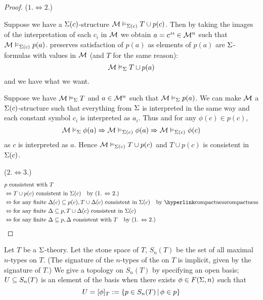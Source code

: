 \begin{proof}
    ($1. \iff 2.$) 
    \begin{forward}
        Suppose we have a $\Sigma(c)$-structure 
        $\mathcal{M} \vDash_{\Sigma(c)} T \cup p(c)$.
        Then by taking the images of the interpretation of each $c_i$ in $\mathcal{M}$
        we obtain $a = \modintp{\MM}{c} \in {\MM}^n$ such that 
        $\mathcal{M} \vDash_{\Sigma(c)} p(a)$.
         preserves 
        satisfaction of $p(a)$  as elements of $p(a)$ are $\Sigma$-formulas
        with values in $\mathcal{M}$ (and $T$ for the same reason):
        \[\mathcal{M} \vDash_{\Sigma} T \cup p(a)\]
        and we have what we want.
    \end{forward}

    \begin{backward}
        Suppose we have $\mathcal{M} \vDash_{\Sigma} T$ and $a \in {\mathcal{M}}^n$
        such that $\mathcal{M} \vDash_{\Sigma} p(a)$.
        We can make $\mathcal{M}$ a $\Sigma(c)$-structure such that 
        everything from $\Sigma$ is interpreted in the same way 
        and each constant symbol $c_i$ is interpreted as $a_i$.
        Thus  and for any 
        $\phi(c) \in p(c)$,
        \[\mathcal{M} \vDash_{\Sigma} \phi(a) \Rightarrow \mathcal{M} \vDash_{\Sigma(c)} \phi(a)
        \Rightarrow \mathcal{M} \vDash_{\Sigma(c)} \phi(c)\]
        as $c$ is interpreted as $a$.
        Hence $\mathcal{M} \vDash_{\Sigma(c)} T \cup p(c)$ 
        and $T \cup p(c)$ is consistent in $\Sigma(c)$.
    \end{backward}

    ($2. \iff 3.$) 
    \begin{align*}
        &p \text{ consistent with } T \\
        &\iff T \cup p(c) \text{ consistent in } \Si(c) 
        \quad \text{by (1. $\iff$ 2.)}\\
        &\iff \text{for any finite } \De(c) \subs p(c), 
        T \cup \De(c) \text{ consistent in } \Si(c) 
        \quad \text{by \linkto{compactness}{compactness}}\\
        &\iff \text{for any finite } \De \subs p, 
        T \cup \De(c) \text{ consistent in } \Si(c) \\
        &\iff \text{for any finite } \De \subs p, 
        \De \text{ consistent with } T
        \quad \text{by (1. $\iff$ 2.)}
    \end{align*}
\end{proof}

\begin{dfn}
    Let $T$ be a $\Sigma$-theory.
    Let the stone space of $T$, 
    $S_n(T)$ be the set of all maximal $n$-types on $T$.
    (The signature of the $n$-types of the on $T$ is implicit, 
    given by the signature of $T$.)
    We give a topology on $S_n(T)$ by specifying an open basis;
    $U \subseteq S_n(T)$ is an element of the basis when there exists 
    $\phi \in F(\Sigma,n)$ such that 
    \[U = [\phi]_T := \left\{p \in S_n(T) \,|\, \phi \in p\right\}\]
\end{dfn}

